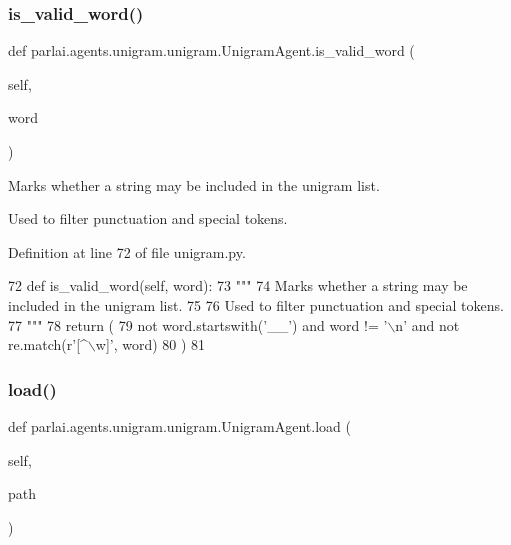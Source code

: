 \subsubsection{\texorpdfstring{is\+\_\+valid\+\_\+word()}{is\_valid\_word()}}
{\footnotesize\ttfamily def parlai.\+agents.\+unigram.\+unigram.\+Unigram\+Agent.\+is\+\_\+valid\+\_\+word (\begin{DoxyParamCaption}\item[{}]{self,  }\item[{}]{word }\end{DoxyParamCaption})}

\begin{DoxyVerb}Marks whether a string may be included in the unigram list.

Used to filter punctuation and special tokens.
\end{DoxyVerb}
 

Definition at line 72 of file unigram.\+py.


\begin{DoxyCode}
72     \textcolor{keyword}{def }is\_valid\_word(self, word):
73         \textcolor{stringliteral}{"""}
74 \textcolor{stringliteral}{        Marks whether a string may be included in the unigram list.}
75 \textcolor{stringliteral}{}
76 \textcolor{stringliteral}{        Used to filter punctuation and special tokens.}
77 \textcolor{stringliteral}{        """}
78         \textcolor{keywordflow}{return} (
79             \textcolor{keywordflow}{not} word.startswith(\textcolor{stringliteral}{'\_\_'}) \textcolor{keywordflow}{and} word != \textcolor{stringliteral}{'\(\backslash\)n'} \textcolor{keywordflow}{and} \textcolor{keywordflow}{not} re.match(\textcolor{stringliteral}{r'[^\(\backslash\)w]'}, word)
80         )
81 
\end{DoxyCode}
\mbox{\label{classparlai_1_1agents_1_1unigram_1_1unigram_1_1UnigramAgent_a01fa26682df757201166d6f18be60da8}} 
\subsubsection{\texorpdfstring{load()}{load()}}
{\footnotesize\ttfamily def parlai.\+agents.\+unigram.\+unigram.\+Unigram\+Agent.\+load (\begin{DoxyParamCaption}\item[{}]{self,  }\item[{}]{path }\end{DoxyParamCaption})}

